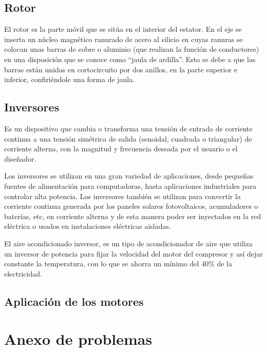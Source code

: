 \subsection{Rotor}
El rotor es la parte móvil que se sitúa en el interior del estator. En el eje se inserta un núcleo magnético ranurado de acero al silicio en cuyas ranuras se colocan unas barras de cobre o aluminio (que realizan la función de conductores) en una disposición que se conoce como “jaula de ardilla”. Esto se debe a que las barras están unidas en cortocircuito por dos anillos, en la parte superior e inferior, confiriéndole una forma de jaula.

\subsection{Inversores}
Es un dispositivo que cambia o transforma una tensión de entrada de corriente continua a una tensión simétrica de salida (senoidal, cuadrada o triangular) de corriente alterna, con la magnitud y frecuencia deseada por el usuario o el diseñador.

Los inversores se utilizan en una gran variedad de aplicaciones, desde pequeñas fuentes de alimentación para computadoras, hasta aplicaciones industriales para controlar alta potencia. Los inversores también se utilizan para convertir la corriente continua generada por los paneles solares fotovoltaicos, acumuladores o baterías, etc, en corriente alterna y de esta manera poder ser inyectados en la red eléctrica o usados en instalaciones eléctricas aisladas.

El aire acondicionado inversor, es un tipo de acondicionador de aire que utiliza un inversor de potencia para fijar la velocidad del motor del compresor y así dejar constante la temperatura, con lo que se ahorra un mínimo del 40\% de la electricidad.

\subsection{Aplicación de los motores}

\section{Anexo de problemas}


